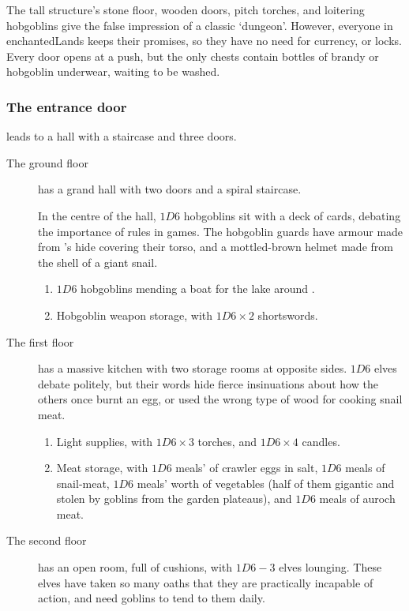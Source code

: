 \begin{multicols}{2}
The tall structure's stone floor, wooden doors, pitch torches, and loitering hobgoblins give the false impression of a classic `dungeon'.
However, everyone in \gls{enchantedLands} keeps their promises, so they have no need for currency, or locks.
Every door opens at a push, but the only chests contain bottles of brandy or hobgoblin underwear, waiting to be washed.

\subsubsection{The entrance door}
leads to a hall with a staircase and three doors.

\begin{description}
  \item[The ground floor]
  has a grand hall with two doors and a spiral staircase.

  In the centre of the hall, $1D6$ hobgoblins sit with a deck of cards, debating the importance of rules in games.
  The hobgoblin guards have \gls{armour} made from 's hide \gls{covering} their torso, and a mottled-brown helmet made from the shell of a giant snail.
  \begin{enumerate}
    \item
    $1D6$ hobgoblins mending a boat for the lake around .
    \item
    Hobgoblin weapon storage, with $1D6 \times 2$ shortswords.
  \end{enumerate}
  \item[The first floor]
  has a massive kitchen with two storage rooms at opposite sides.
  $1D6$ elves debate politely, but their words hide fierce insinuations about how the others once burnt an egg, or used the wrong type of wood for cooking snail meat.
  \begin{enumerate}
    \item
    Light supplies, with $1D6 \times 3$ torches, and $1D6 \times 4$ candles.
    \item
    Meat storage, with $1D6$ meals' of \gls{crawler} eggs in salt, $1D6$ meals of snail-meat, $1D6$ meals' worth of vegetables (half of them gigantic and stolen by goblins from the garden plateaus), and $1D6$ meals of auroch meat.
  \end{enumerate}
  \item[The second floor]
  has an open room, full of cushions, with $1D6-3$ elves lounging.
  These elves have taken so many oaths that they are practically incapable of action, and need goblins to tend to them daily.


\end{description}
\end{multicols}
